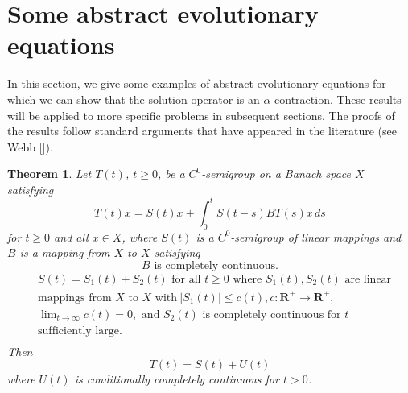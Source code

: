 \documentclass{surv-l}
\theoremstyle{plain}
\newtheorem{theorem}{Theorem}[section]
\theoremstyle{definition}
\numberwithin{equation}{section}
\numberwithin{figure}{chapter}
\begin{document}
\section{Some abstract evolutionary equations}\label{sec4.6}
In this section, we give some examples of abstract evolutionary equations for which we can show that the solution operator is an $\alpha$-contraction. These results will be applied to more specific problems in subsequent sections. The proofs of the results follow standard arguments that have appeared in the literature (see Webb [\citeyear{1979wa}]).
\begin{theorem}\label{thm4.6.1} Let $T(t)$, $t\geq 0$, be a $C^{0}$-semigroup on a Banach space $X$ satisfying
\begin{equation}\label{chap04:eq6.1}
T(t)x=S(t)x+\int_{0}^{t}S(t-s)BT(s)x\,ds
\end{equation}
for $t\geq 0$ and all $x\in X$, where $S(t)$ is a $C^{0}$-semigroup of linear mappings and $B$ is a mapping from $X$ to $X$ satisfying
\begin{equation}\label{chap04:eq6.2}
\text{$B$ is completely continuous.}
\end{equation}
\begin{equation}\label{chap04:eq6.3}
\begin{split}
&S(t)=S_{1}(t)+S_{2}(t) \text{ for all }t\geq 0 \text{ where } S_{1}(t), S_{2}(t) \text{ are linear} \\
&\text{mappings from $X$ to $X$ with}\ |S_{1}(t)|\leq c(t), c:\mathbf{R}^{+}\rightarrow \mathbf{R}^{+},\\
&{\lim\nolimits_{t\rightarrow\infty}}c(t)=0,\text{ and } S_{2}(t) \text{ is completely continuous for } t\,\\
&\text{sufficiently  large}.\\
\end{split}
\end{equation}
Then
\begin{equation*}
T(t)=S(t)+U(t)
\end{equation*}
where $U(t)$ is conditionally completely continuous for $t>0$.
\end{theorem}
\end{document}
